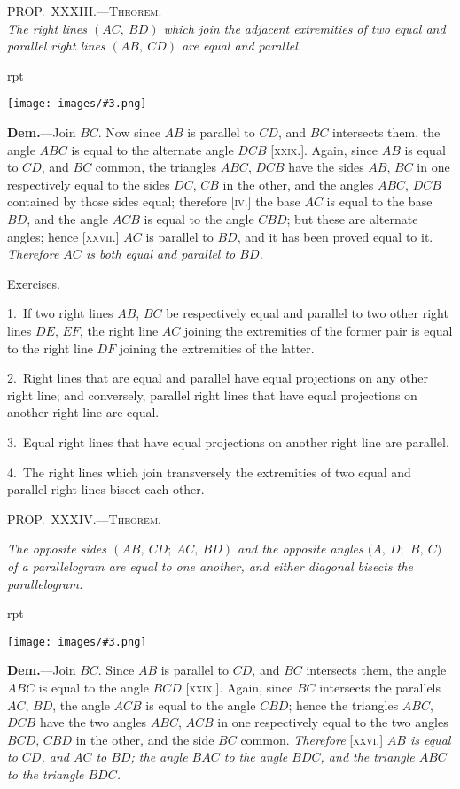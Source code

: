 \documentclass[oneside]{book}
\newcounter{wrapwidth}
\newcommand\myprop[2]{
\bigskip\Needspace*{4\baselineskip}\begin{center}\textsc{#1}\\\medskip\emph{#2}\par\end{center}
}
\newcommand\mypropl[2]{
\bigskip\Needspace*{4\baselineskip}\begin{center}\textsc{#1}\end{center}
\hspace{\parindent}\emph{#2}\par\medskip
}
\newcommand\exhead[1]{
\Needspace*{5\baselineskip}\begin{center}
\textsf{#1}
\end{center}
}
\newcommand\imgflow[3]{
\setcounter{wrapwidth}{#1}
\begin{wrapfigure}[#2]{r}{\value{wrapwidth}pt}
\begin{center}
\vspace{-0.3in}
\texttt{[image: images/\#3.png]}
\end{center}
\end{wrapfigure}
}
\begin{document}
\myprop{PROP\@.~XXXIII\@.---Theorem.}{The right lines $(AC,\ BD)$ which join the adjacent extremities
of two equal and parallel right lines $(AB,\ CD)$ are equal and parallel.}

\imgflow{133}{9}{f053}

\textbf{Dem.}---Join $BC$. Now since $AB$ is parallel to $CD$,
and $BC$ intersects them, the
angle $ABC$ is equal to the
alternate angle $DCB$ [\textsc{xxix.}].
Again, since $AB$ is equal to
$CD$, and $BC$ common, the triangles
$ABC$, $DCB$ have the
sides $AB$, $BC$ in one respectively
equal to the sides $DC$,
$CB$ in the other, and the angles $ABC$, $DCB$ contained
by those sides equal; therefore [\textsc{iv.}] the base $AC$ is
equal to the base $BD$, and the angle $ACB$ is equal to
the angle $CBD$; but these are alternate angles; hence
[\textsc{xxvii.}] $AC$ is parallel to $BD$, and it has been proved
equal to it. \emph{Therefore $AC$ is both equal and parallel to $BD$.}


\exhead{Exercises.}

\begin{footnotesize}
1.~If two right lines $AB$, $BC$ be respectively equal and parallel
to two other right lines $DE$, $EF$, the right line $AC$ joining the
extremities of the former pair is equal to the right line $DF$ joining
the extremities of the latter.

2.~Right lines that are equal and parallel have equal projections
on any other right line; and conversely, parallel right lines that
have equal projections on another right line are equal.

3.~Equal right lines that have equal projections on another
right line are parallel.

4.~The right lines which join transversely the extremities of
two equal and parallel right lines bisect each other.
\par\end{footnotesize}


\mypropl{PROP\@.~XXXIV\@.---Theorem.}{The opposite sides $(AB,\ CD;\ AC,\ BD)$ and the opposite
angles $(A,\ D;$ $B,\ C)$ of a parallelogram are equal to
one another, and either diagonal bisects the parallelogram.}

\imgflow{133}{8}{f054}

\textbf{Dem.}---Join $BC$. Since $AB$ is parallel to $CD$, and
$BC$ intersects them, the angle
$ABC$ is equal to the angle
$BCD$ [\textsc{xxix.}]. Again, since
$BC$ intersects the parallels $AC$,
$BD$, the angle $ACB$ is equal to
the angle $CBD$; hence the triangles
$ABC$, $DCB$ have the two
angles $ABC$, $ACB$ in one respectively
equal to the two angles $BCD$, $CBD$ in the other,
and the side $BC$ common. \emph{Therefore} [\textsc{xxvi.}] \emph{$AB$ is equal
to $CD$, and $AC$ to $BD$; the angle $BAC$ to the angle $BDC$,
and the triangle $ABC$ to the triangle $BDC$.}
\end{document}
